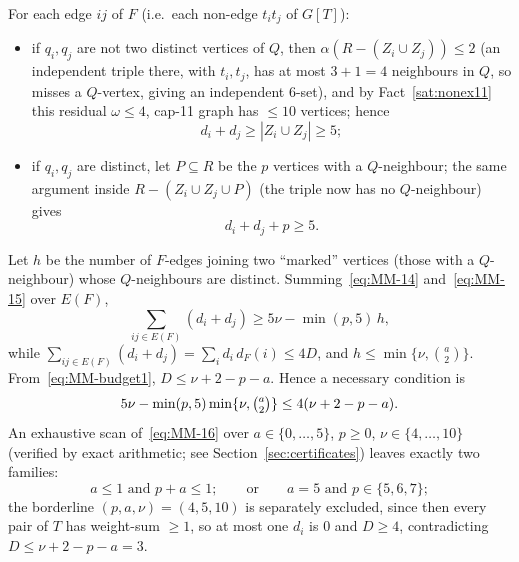 \documentclass[11pt,reqno]{amsart}
\theoremstyle{definition}
\theoremstyle{remark}
\newcommand{\abs}[1]{\left|#1\right|}
\newcommand{\capeleven}{\textsf{cap-11}}
\begin{document}
For each edge $ij$ of $F$ (i.e.\ each non-edge $t_it_j$ of $G[T]$):
\begin{itemize}[nosep]
\item if $q_i,q_j$ are not two distinct vertices of $Q$, then
$\alpha(R-(Z_i\cup Z_j))\le 2$ (an independent triple there, with $t_i,t_j$, has at
most $3+1=4$ neighbours in $Q$, so misses a $Q$-vertex, giving an independent
$6$-set), and by Fact~\ref{sat:nonex11} this residual $\omega\le 4$, \capeleven{}
graph has $\le 10$ vertices; hence
\begin{equation}\label{eq:MM-14}
  d_i+d_j\ge \abs{Z_i\cup Z_j}\ge 5 ;
\end{equation}
\item if $q_i,q_j$ are distinct, let $P\subseteq R$ be the $p$ vertices with a
$Q$-neighbour; the same argument inside $R-(Z_i\cup Z_j\cup P)$ (the triple now has
no $Q$-neighbour) gives
\begin{equation}\label{eq:MM-15}
  d_i+d_j+p\ge 5 .
\end{equation}
\end{itemize}
Let $h$ be the number of $F$-edges joining two ``marked'' vertices (those with a
$Q$-neighbour) whose $Q$-neighbours are distinct. Summing~\eqref{eq:MM-14}
and~\eqref{eq:MM-15} over $E(F)$,
\[
  \sum_{ij\in E(F)}(d_i+d_j)\ge 5\nu-\min(p,5)\,h,
\]
while $\sum_{ij\in E(F)}(d_i+d_j)=\sum_i d_i\,d_F(i)\le 4D$, and $h\le\min\{\nu,\binom a2\}$.
From~\eqref{eq:MM-budget1}, $D\le \nu+2-p-a$. Hence a necessary condition is
\begin{equation}\label{eq:MM-16}
  5\nu-\min(p,5)\min\{\nu,\tbinom a2\}\le 4(\nu+2-p-a).
\end{equation}
An exhaustive scan of~\eqref{eq:MM-16} over $a\in\{0,\dots,5\}$, $p\ge 0$,
$\nu\in\{4,\dots,10\}$ (verified by exact arithmetic; see
Section~\ref{sec:certificates}) leaves exactly two families:
\[
  a\le 1\text{ and } p+a\le 1;\qquad\text{or}\qquad a=5\text{ and }p\in\{5,6,7\};
\]
the borderline $(p,a,\nu)=(4,5,10)$ is separately excluded, since then every pair of
$T$ has weight-sum $\ge 1$, so at most one $d_i$ is $0$ and $D\ge 4$, contradicting
$D\le\nu+2-p-a=3$.
\end{document}
